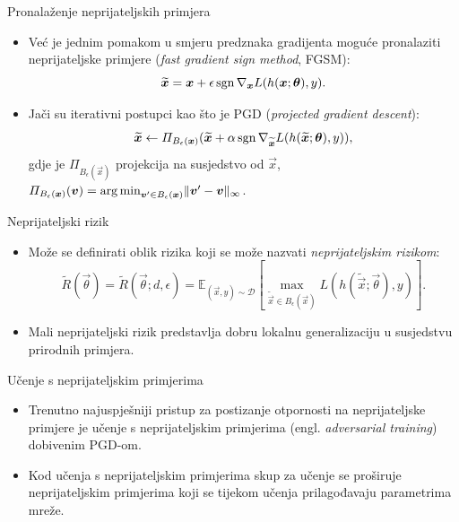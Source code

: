 \documentclass{beamer}
\begin{document}
\begin{frame}{Pronalaženje neprijateljskih primjera}
\begin{itemize}
	\item Već je jednim pomakom u smjeru predznaka gradijenta moguće pronalaziti neprijateljske primjere (\emph{fast gradient sign method}, FGSM):
	\begin{equation}
\widetilde{\vec x} = \vec x + \epsilon\sgn \nabla_{\vec x} L(h(\vec x;\vec\theta), y).
	\end{equation}
	\item Jači su iterativni postupci kao što je PGD (\emph{projected gradient descent}):
	\begin{equation} \label{eq:pgd}
\widetilde{\vec x} \gets \Pi_{B_\epsilon(\vec x)} (\widetilde{\vec x} + \alpha\sgn\nabla_{\widetilde{\vec x}} L(h(\widetilde{\vec x};\vec\theta), y)),
	\end{equation}
	gdje je $\Pi_{B_\epsilon(\vec x)}$ projekcija na susjedstvo od $\vec x$, $\Pi_{B_\epsilon(\vec x)}(\vec v) = \argmin_{\vec v'\in B_\epsilon(\vec x)}\lVert \vec v'-\vec v\rVert_\infty$.
\end{itemize}
\end{frame}

\begin{frame}{Neprijateljski rizik}
\begin{itemize}
	\item Može se definirati oblik rizika koji se može nazvati \emph{neprijateljskim rizikom}:
	\begin{equation}\label{eq:adv-risk}
\widetilde{R}(\vec\theta) = \widetilde{R}(\vec\theta;d,\epsilon) = \mathbb{E}_{(\vec x,y)\sim\mathcal{D}}\left[
\max_{\widetilde{\vec x} \in B_\epsilon(\vec x)} L(h(\widetilde{\vec x};\vec\theta), y) \right].
	\end{equation}
	\item Mali neprijateljski rizik predstavlja dobru lokalnu generalizaciju u susjedstvu prirodnih primjera.
\end{itemize}
\end{frame}

\begin{frame}{Učenje s neprijateljskim primjerima}
\begin{itemize}
	\item Trenutno najuspješniji pristup za postizanje otpornosti na neprijateljske primjere je učenje s neprijateljskim primjerima (engl. \emph{adversarial training}) dobivenim PGD-om.
	\item Kod učenja s neprijateljskim primjerima skup za učenje se proširuje neprijateljskim primjerima koji se tijekom učenja prilagođavaju parametrima mreže.
\end{itemize}
\end{frame}
\end{document}
